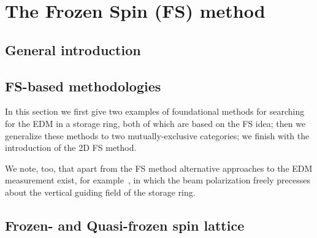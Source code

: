 \chapter{The Frozen Spin (FS) method}\label{chpt1:top-level}

\section{General introduction}\label{chpt1:FS-introduction}


\section{FS-based methodologies}\label{chpt1:FS-methods}
In this section we first give two examples of foundational methods for searching for the EDM
in a storage ring, both of which are based on the FS idea;
then we generalize these methods to two mutually-exclusive categories;
we finish with the introduction of the 2D FS method.

We note, too, that apart from the FS method alternative approaches to the EDM measurement exist,
for example~\cite{COSY:SpinTuneMapping, COSY:Partially-Frozen-Spin}, in which the beam polarization
freely precesses about the vertical guiding field of the storage ring.



\section{Frozen- and Quasi-frozen spin lattice} \label{chpt1:Lattices}



\clearpage
